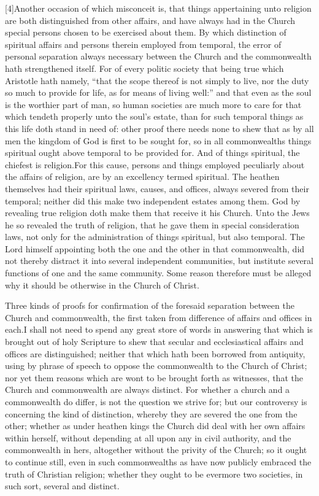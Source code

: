 [4]Another occasion of which misconceit is, that things appertaining unto religion are both distinguished from other affairs, and have always had in the Church special persons chosen to be exercised about them. By which distinction of spiritual affairs and persons therein employed from temporal, the error of personal separation always necessary between the Church and the commonwealth hath strengthened itself. For of every politic society that being true which Aristotle hath namely, “that the scope thereof is not simply to live, nor the duty so much to provide for life, as for means of living well:” and that even as the soul is the worthier part of man, so human societies are much more to care for that which tendeth properly unto the soul’s estate, than for such temporal things as this life doth stand in need of: other proof there needs none to shew that as by all men the kingdom of God is first to be sought for, so in all commonwealths things spiritual ought above temporal to be provided for. And of things spiritual, the chiefest is religion.For this cause, persons and things employed peculiarly about the affairs of religion, are by an excellency termed spiritual. The heathen themselves had their spiritual laws, causes, and offices, always severed from their temporal; neither did this make two independent estates among them. God by revealing true religion doth make them that receive it his  Church. Unto the Jews he so revealed the truth of religion, that he gave them in special consideration laws, not only for the administration of things spiritual, but also temporal. The Lord himself appointing both the one and the other in that commonwealth, did not thereby distract it into several independent communities, but institute several functions of one and the same community. Some reason therefore must be alleged why it should be otherwise in the Church of Christ.

Three kinds of proofs for confirmation of the foresaid separation between the Church and commonwealth, the first taken from difference of affairs and offices in each.I shall not need to spend any great store of words in answering that which is brought out of holy Scripture to shew that secular and ecclesiastical affairs and offices are distinguished; neither that which hath been borrowed from antiquity, using by phrase of speech to oppose the commonwealth to the Church of Christ; nor yet them reasons which are wont to be brought forth as witnesses, that the Church and commonwealth are always distinct. For whether a church and a commonwealth do differ, is not the question we strive for; but our controversy is concerning the kind of distinction, whereby they are severed the one from the other; whether as under heathen kings the Church did deal with her own affairs within herself, without depending at all upon any in civil authority, and the commonwealth in hers, altogether without the privity of the Church; so it ought to continue still, even in such commonwealths as have now publicly embraced the truth of Christian religion; whether they ought to be evermore two societies, in such sort, several and distinct.

